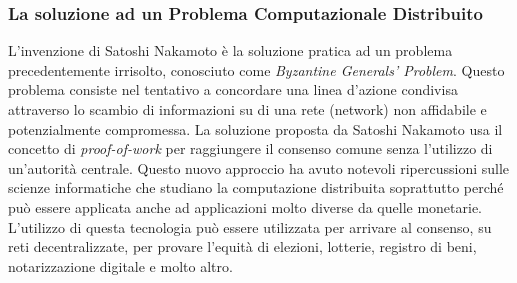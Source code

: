 \subsubsection{La soluzione ad un Problema Computazionale Distribuito}
L'invenzione di Satoshi Nakamoto è la soluzione pratica ad un problema precedentemente irrisolto, conosciuto come \textit{Byzantine Generals’ Problem}. Questo problema consiste nel tentativo a concordare una linea d'azione condivisa attraverso lo scambio di informazioni su di una rete (network) non affidabile e potenzialmente compromessa. La soluzione proposta da Satoshi Nakamoto usa il concetto di \textit{proof-of-work} per raggiungere il consenso comune senza l'utilizzo di un'autorità centrale. Questo nuovo approccio ha avuto notevoli ripercussioni sulle scienze informatiche che studiano la computazione distribuita soprattutto perché può essere applicata anche ad applicazioni molto diverse da quelle monetarie. L'utilizzo di questa tecnologia può essere utilizzata per arrivare al consenso, su reti decentralizzate, per provare l'equità di elezioni, lotterie, registro di beni, notarizzazione digitale e molto altro.

